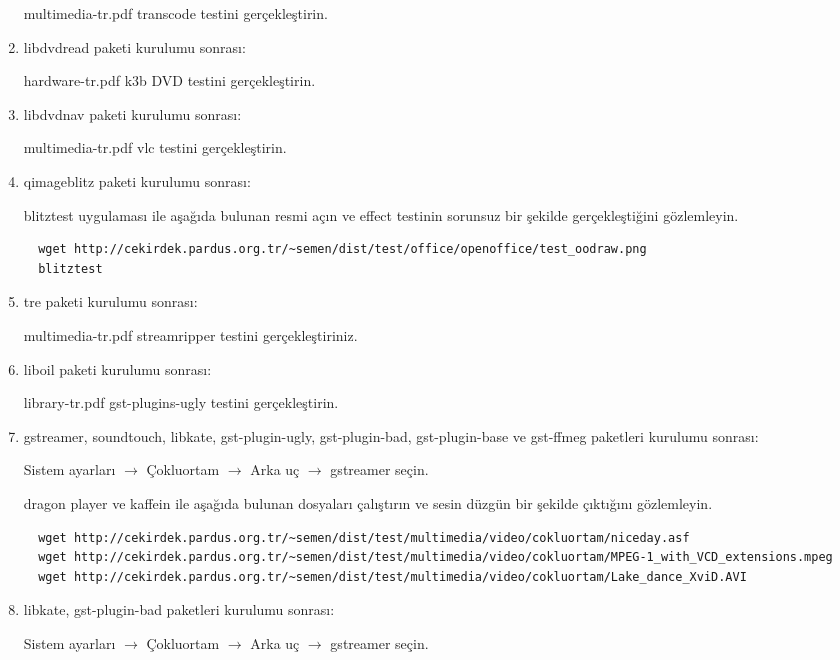 \documentclass[a4paper,10pt]{article}
\begin{document}
\begin{enumerate}
multimedia-tr.pdf transcode testini gerçekleştirin.

\item libdvdread paketi kurulumu sonrası:

hardware-tr.pdf k3b DVD testini gerçekleştirin.

\item libdvdnav paketi kurulumu sonrası:

multimedia-tr.pdf vlc testini gerçekleştirin.

\item qimageblitz paketi kurulumu sonrası:

blitztest uygulaması ile aşağıda bulunan resmi açın ve effect testinin sorunsuz bir şekilde gerçekleştiğini gözlemleyin.
\begin{verbatim}
  wget http://cekirdek.pardus.org.tr/~semen/dist/test/office/openoffice/test_oodraw.png
  blitztest
\end{verbatim}


\item tre paketi kurulumu sonrası:

multimedia-tr.pdf streamripper testini gerçekleştiriniz.

\item liboil paketi kurulumu sonrası:

library-tr.pdf gst-plugins-ugly testini gerçekleştirin.

\item gstreamer, soundtouch, libkate, gst-plugin-ugly, gst-plugin-bad, gst-plugin-base ve gst-ffmeg paketleri kurulumu sonrası:

Sistem ayarları $\rightarrow$ Çokluortam $\rightarrow$ Arka uç $\rightarrow$ gstreamer seçin. 

dragon player ve kaffein ile aşağıda bulunan dosyaları çalıştırın ve sesin düzgün bir şekilde çıktığını gözlemleyin.
\begin{verbatim}
  wget http://cekirdek.pardus.org.tr/~semen/dist/test/multimedia/video/cokluortam/niceday.asf
  wget http://cekirdek.pardus.org.tr/~semen/dist/test/multimedia/video/cokluortam/MPEG-1_with_VCD_extensions.mpeg
  wget http://cekirdek.pardus.org.tr/~semen/dist/test/multimedia/video/cokluortam/Lake_dance_XviD.AVI
\end{verbatim}

\item libkate, gst-plugin-bad paketleri kurulumu sonrası:

Sistem ayarları $\rightarrow$ Çokluortam $\rightarrow$ Arka uç $\rightarrow$ gstreamer seçin. 


\end{enumerate}
\end{document}
